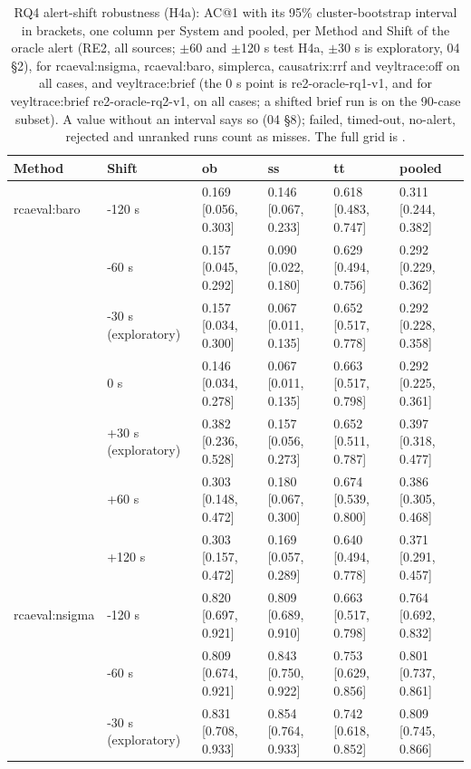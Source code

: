 \begin{table}[t]
\centering
\caption{RQ4 alert-shift robustness (H4a): AC@1 with its 95\% cluster-bootstrap interval in brackets, one column per System and pooled, per Method and Shift of the oracle alert (RE2, all sources; $\pm$60 and $\pm$120 s test H4a, $\pm$30 s is exploratory, 04 \S{}2), for rcaeval:nsigma, rcaeval:baro, simplerca, causatrix:rrf and veyltrace:off on all cases, and veyltrace:brief (the 0 s point is re2-oracle-rq1-v1, and for veyltrace:brief re2-oracle-rq2-v1, on all cases; a shifted brief run is on the 90-case subset). A value without an interval says so (04 \S{}8); failed, timed-out, no-alert, rejected and unranked runs count as misses. The full grid is .}
\label{tab:t10-rq4-shift-paper}
\footnotesize
\setlength{\tabcolsep}{3pt}%
\begin{tabular}{@{}llllll@{}}
\hline
Method & Shift & ob & ss & tt & pooled \\
\hline
rcaeval:baro & -120 s & 0.169 [0.056, 0.303] & 0.146 [0.067, 0.233] & 0.618 [0.483, 0.747] & 0.311 [0.244, 0.382] \\
 & -60 s & 0.157 [0.045, 0.292] & 0.090 [0.022, 0.180] & 0.629 [0.494, 0.756] & 0.292 [0.229, 0.362] \\
 & -30 s (exploratory) & 0.157 [0.034, 0.300] & 0.067 [0.011, 0.135] & 0.652 [0.517, 0.778] & 0.292 [0.228, 0.358] \\
 & 0 s & 0.146 [0.034, 0.278] & 0.067 [0.011, 0.135] & 0.663 [0.517, 0.798] & 0.292 [0.225, 0.361] \\
 & +30 s (exploratory) & 0.382 [0.236, 0.528] & 0.157 [0.056, 0.273] & 0.652 [0.511, 0.787] & 0.397 [0.318, 0.477] \\
 & +60 s & 0.303 [0.148, 0.472] & 0.180 [0.067, 0.300] & 0.674 [0.539, 0.800] & 0.386 [0.305, 0.468] \\
 & +120 s & 0.303 [0.157, 0.472] & 0.169 [0.057, 0.289] & 0.640 [0.494, 0.778] & 0.371 [0.291, 0.457] \\
rcaeval:nsigma & -120 s & 0.820 [0.697, 0.921] & 0.809 [0.689, 0.910] & 0.663 [0.517, 0.798] & 0.764 [0.692, 0.832] \\
 & -60 s & 0.809 [0.674, 0.921] & 0.843 [0.750, 0.922] & 0.753 [0.629, 0.856] & 0.801 [0.737, 0.861] \\
 & -30 s (exploratory) & 0.831 [0.708, 0.933] & 0.854 [0.764, 0.933] & 0.742 [0.618, 0.852] & 0.809 [0.745, 0.866] \\

\end{tabular}
\end{table}
